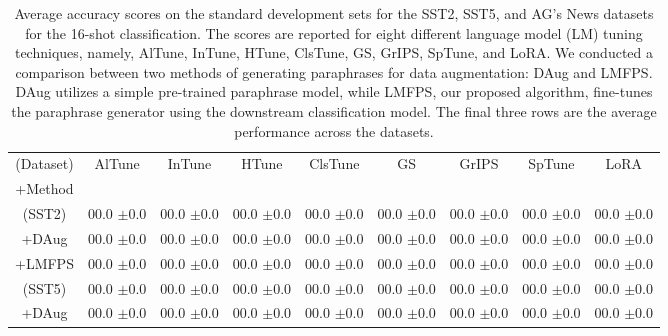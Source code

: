\documentclass[11pt]{article}
\begin{document}
\begin{table*}
\centering
\caption{Average accuracy scores on the standard development sets for the SST2, SST5, and AG's News datasets for the 16-shot classification. The scores are reported for eight different language model (LM) tuning techniques, namely, AlTune, InTune, HTune, ClsTune, GS, GrIPS, SpTune, and LoRA. We conducted a comparison between two methods of generating paraphrases for data augmentation: DAug and LMFPS. DAug utilizes a simple pre-trained paraphrase model, while LMFPS, our proposed algorithm, fine-tunes the paraphrase generator using the downstream classification model. The final three rows are the average performance across the datasets.}
\begin{tabular}{c | c | c | c | c | c | c | c | c}
\hline
(Dataset) & AlTune & InTune & HTune & ClsTune & GS & GrIPS & SpTune & LoRA \\
\small+Method &  &  &  &  &  &  &  &  \\
\hline
(SST2) & \small00.0 \small$\pm$\small0.0 & \small00.0 \small$\pm$\small0.0 & \small00.0 \small$\pm$\small0.0 & \small00.0 \small$\pm$\small0.0 & \small00.0 \small$\pm$\small0.0 & \small00.0 \small$\pm$\small0.0 & \small00.0 \small$\pm$\small0.0 & \small00.0 \small$\pm$\small0.0\\
\small+DAug & \small00.0 \small$\pm$\small0.0 & \small00.0 \small$\pm$\small0.0 & \small00.0 \small$\pm$\small0.0 & \small00.0 \small$\pm$\small0.0 & \small00.0 \small$\pm$\small0.0 & \small00.0 \small$\pm$\small0.0 & \small00.0 \small$\pm$\small0.0 & \small00.0 \small$\pm$\small0.0\\
\small+LMFPS & \small00.0 \small$\pm$\small0.0 & \small00.0 \small$\pm$\small0.0 & \small00.0 \small$\pm$\small0.0 & \small00.0 \small$\pm$\small0.0 & \small00.0 \small$\pm$\small0.0 & \small00.0 \small$\pm$\small0.0 & \small00.0 \small$\pm$\small0.0 & \small00.0 \small$\pm$\small0.0\\
\hline
(SST5) & \small00.0 \small$\pm$\small0.0 & \small00.0 \small$\pm$\small0.0 & \small00.0 \small$\pm$\small0.0 & \small00.0 \small$\pm$\small0.0 & \small00.0 \small$\pm$\small0.0 & \small00.0 \small$\pm$\small0.0 & \small00.0 \small$\pm$\small0.0 & \small00.0 \small$\pm$\small0.0\\
\small+DAug & \small00.0 \small$\pm$\small0.0 & \small00.0 \small$\pm$\small0.0 & \small00.0 \small$\pm$\small0.0 & \small00.0 \small$\pm$\small0.0 & \small00.0 \small$\pm$\small0.0 & \small00.0 \small$\pm$\small0.0 & \small00.0 \small$\pm$\small0.0 & \small00.0 \small$\pm$\small0.0\\

\end{tabular}
\end{table*}
\end{document}

